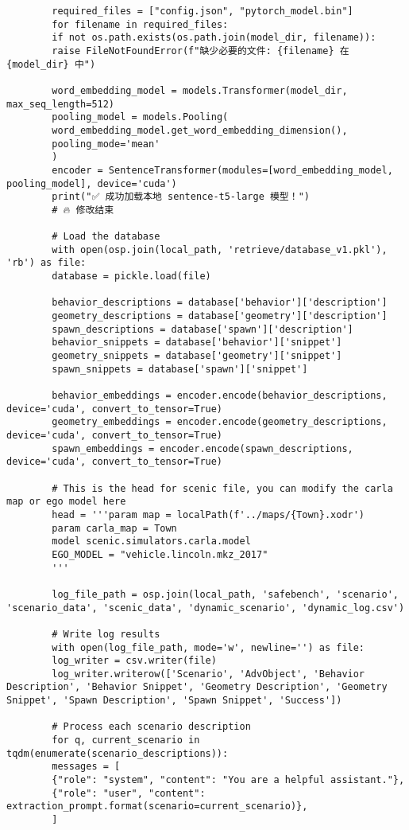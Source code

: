 \begin{lstlisting}
		required_files = ["config.json", "pytorch_model.bin"]
		for filename in required_files:
		if not os.path.exists(os.path.join(model_dir, filename)):
		raise FileNotFoundError(f"缺少必要的文件: {filename} 在 {model_dir} 中")
		
		word_embedding_model = models.Transformer(model_dir, max_seq_length=512)
		pooling_model = models.Pooling(
		word_embedding_model.get_word_embedding_dimension(),
		pooling_mode='mean'
		)
		encoder = SentenceTransformer(modules=[word_embedding_model, pooling_model], device='cuda')
		print("✅ 成功加载本地 sentence-t5-large 模型！")
		# 🔥 修改结束
		
		# Load the database
		with open(osp.join(local_path, 'retrieve/database_v1.pkl'), 'rb') as file:
		database = pickle.load(file)
		
		behavior_descriptions = database['behavior']['description']
		geometry_descriptions = database['geometry']['description']
		spawn_descriptions = database['spawn']['description']
		behavior_snippets = database['behavior']['snippet']
		geometry_snippets = database['geometry']['snippet']
		spawn_snippets = database['spawn']['snippet']
		
		behavior_embeddings = encoder.encode(behavior_descriptions, device='cuda', convert_to_tensor=True)
		geometry_embeddings = encoder.encode(geometry_descriptions, device='cuda', convert_to_tensor=True)
		spawn_embeddings = encoder.encode(spawn_descriptions, device='cuda', convert_to_tensor=True)
		
		# This is the head for scenic file, you can modify the carla map or ego model here
		head = '''param map = localPath(f'../maps/{Town}.xodr') 
		param carla_map = Town
		model scenic.simulators.carla.model
		EGO_MODEL = "vehicle.lincoln.mkz_2017"
		'''
		
		log_file_path = osp.join(local_path, 'safebench', 'scenario', 'scenario_data', 'scenic_data', 'dynamic_scenario', 'dynamic_log.csv')
		
		# Write log results
		with open(log_file_path, mode='w', newline='') as file:
		log_writer = csv.writer(file)
		log_writer.writerow(['Scenario', 'AdvObject', 'Behavior Description', 'Behavior Snippet', 'Geometry Description', 'Geometry Snippet', 'Spawn Description', 'Spawn Snippet', 'Success'])
		
		# Process each scenario description
		for q, current_scenario in tqdm(enumerate(scenario_descriptions)):
		messages = [
		{"role": "system", "content": "You are a helpful assistant."},
		{"role": "user", "content": extraction_prompt.format(scenario=current_scenario)},
		]
		

\end{lstlisting}

